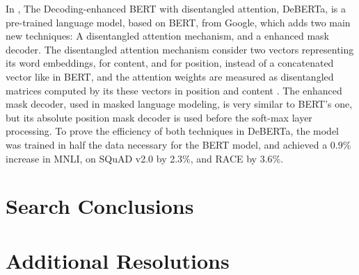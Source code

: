 In \citet{He202003654}, The Decoding-enhanced BERT with disentangled attention, DeBERTa, is a pre-trained language model, based on BERT, from Google, which adds two main new techniques: A disentangled attention mechanism, and a enhanced mask decoder. The disentangled attention mechanism consider two vectors representing its word embeddings, for content, and for position, instead of a concatenated vector like in BERT, and the attention weights are measured as disentangled matrices computed by its these vectors in position and content . The enhanced mask decoder, used in masked language modeling, is very similar to BERT’s one, but its absolute position mask decoder is used before the soft-max layer processing. To prove the efficiency of both techniques in DeBERTa, the model was trained in half the data necessary for the BERT model, and achieved a 0.9\% increase in MNLI, on SQuAD v2.0 by 2.3\%, and RACE by 3.6\%.

\section{Search Conclusions}

\subsection{\RQI}

\subsection{\RQII}

\subsection{\RQIII}

\section{Additional Resolutions}





